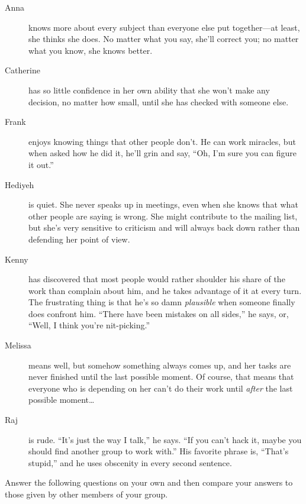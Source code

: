 \begin{description}

\item[Anna]
  knows more about every subject than everyone else put together---at least,
  she thinks she does.
  No matter what you say,
  she'll correct you;
  no matter what you know, she knows better.

\item[Catherine]
  has so little confidence in her own ability
  that she won't make any decision,
  no matter how small,
  until she has checked with someone else.

\item[Frank]
  enjoys knowing things that other people don't.
  He can work miracles,
  but when asked how he did it,
  he'll grin and say,
  ``Oh, I'm sure you can figure it out.''

\item[Hediyeh]
  is quiet.
  She never speaks up in meetings,
  even when she knows that what other people are saying is wrong.
  She might contribute to the mailing list,
  but she's very sensitive to criticism
  and will always back down rather than defending her point of view.

\item[Kenny]
  has discovered that most people would rather shoulder his share of the work
  than complain about him,
  and he takes advantage of it at every turn.
  The frustrating thing is that he's so damn \emph{plausible}
  when someone finally does confront him.
  ``There have been mistakes on all sides,''
  he says,
  or, ``Well, I think you're nit-picking.''

\item[Melissa]
  means well,
  but somehow something always comes up,
  and her tasks are never finished until the last possible moment.
  Of course,
  that means that everyone who is depending on her can't do their work
  until \emph{after} the last possible moment{\ldots}

\item[Raj]
  is rude.
  ``It's just the way I talk,'' he says.
  ``If you can't hack it, maybe you should find another group to work with.''
  His favorite phrase is, ``That's stupid,''
  and he uses obscenity in every second sentence.

\end{description}


Answer the following questions on your own
and then compare your answers to those given by other members of your group.

